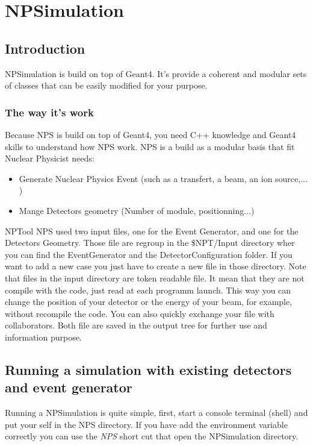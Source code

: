 \documentclass{book}
\begin{document}
				
\chapter[NPSimulation]{NPSimulation}

\section{Introduction}

NPSimulation is build on top of Geant4. 
It's provide a coherent and modular sets of classes that can be easily modified for your purpose.

\subsection{ The way it's work }

Because NPS is build on top of Geant4, you need C++ knowledge and Geant4 skills to understand how NPS work. 
NPS is a build as a modular basis that fit Nuclear Physicist needs: 
	\begin{itemize}
		\item Generate Nuclear Physics Event (such as a transfert, a beam, an ion source,... ) 
		\item Mange Detectors geometry (Number of module, positionning...)
	\end{itemize}
NPTool
NPS used two input files, one for the Event Generator, and one for the Detectors Geometry. 
Those file are regroup in the \$NPT/Input directory wher you can find the EventGenerator and the DetectorConfiguration folder. If you want to add a new case you just have to create a new file in those directory. Note that files in the input directory are token readable file. It mean that they are not compile with the code, just read at each programm launch. This way you can change the position of your detector or the energy of your beam, for example, without recompile the code. You can also quickly exchange your file with collaborators. Both file are saved in the output tree for further use and information purpose.

\section{ Running a simulation with existing detectors and event generator }

Running a NPSimulation is quite simple, first, start a console terminal (shell) and put your self in the NPS directory.
If you have add the environment variable correctly you can use the \emph{NPS} short cut that open the NPSimulation directory.
	
\end{document}
